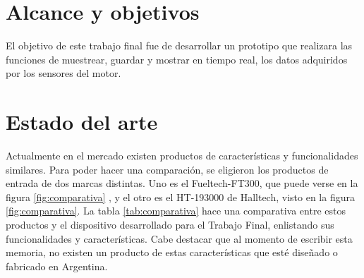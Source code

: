 \section{Alcance y objetivos}

El objetivo de este trabajo final fue de desarrollar un prototipo que realizara las funciones de muestrear, guardar y mostrar en tiempo real, los datos adquiridos por los sensores del motor. 

\section{Estado del arte}

Actualmente en el mercado existen productos de características y funcionalidades similares. Para poder hacer una comparación, se eligieron los productos de entrada de dos marcas distintas. Uno es el Fueltech-FT300, que puede verse en la figura \ref{fig:comparativa} ,  y el otro es el HT-193000 de Halltech, visto en la figura \ref{fig:comparativa}. La tabla \ref{tab:comparativa} hace una comparativa entre estos productos y el dispositivo desarrollado para el Trabajo Final, enlistando sus funcionalidades y características. Cabe destacar que al momento de escribir esta memoria, no existen un producto de estas características que esté diseñado o fabricado en Argentina.

